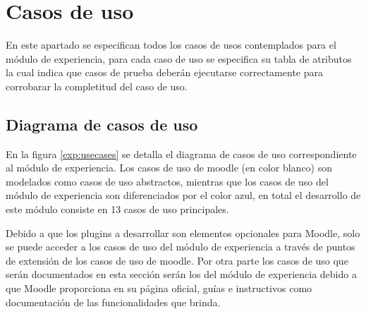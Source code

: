 
\clearpage
\section{Casos de uso}

 En este apartado se especifican todos los casos de usos contemplados para el módulo de
 experiencia, para cada caso de uso se especifica su tabla de atributos la cual indica que casos
 de prueba deberán ejecutarse correctamente para corrobarar la completitud del caso de uso.

\subsection{Diagrama de casos de uso}

 En la figura \ref{exp:usecases} se detalla el diagrama de casos de uso correspondiente al módulo
 de experiencia. Los casos de uso de moodle (en color blanco) son modelados como casos de uso
 abstractos, mientras que los casos de uso del módulo de experiencia son diferenciados por el
 color azul, en total el desarrollo de este módulo consiste en 13 casos de uso principales.


 \noindent
 Debido a que los plugins a desarrollar son elementos opcionales para Moodle, solo se puede
 acceder a los casos de uso del módulo de experiencia a través de puntos de extensión de los
 casos de uso de moodle. Por otra parte los casos de uso que serán documentados en esta sección
 serán los del módulo de experiencia debido a que Moodle proporciona en su página oficial, guías
 e instructivos como documentación de las funcionalidades que brinda.


